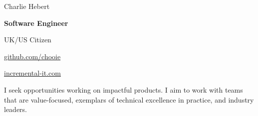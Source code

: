 \begin{center}
  {\Huge Charlie Hebert}

  \textbf{Software Engineer}

  UK/US Citizen
\end{center}

\noindent
\begin{minipage}[t]{0.5\textwidth}
\end{minipage}
\noindent
\noindent
\begin{minipage}[t]{0.5\textwidth}
  \begin{description}
    \raggedleft
    \item[My code] \href{http://www.github.com/chooie}{github.com/chooie}
    \item[Website]
      \href{http://incremental-it.com}{incremental-it.com}
  \end{description}
\end{minipage}
\noindent

\begin{center}
  I seek opportunities working on impactful products. I aim to work with teams
  that are value-focused, exemplars of technical excellence in practice, and
  industry leaders.
\end{center}

